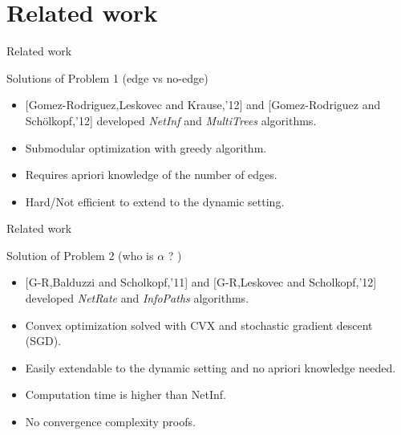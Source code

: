\documentclass{beamer}
\begin{document}
\section{Related work}
\begin{frame}{Related work}
\begin{block}{Solutions of Problem 1 (edge vs no-edge)}
\begin{itemize}
    \item {[Gomez-Rodriguez,Leskovec and Krause,'12]}\nocite{NetInf} and [Gomez-Rodriguez and Schölkopf,'12] \nocite{MultiTrees} developed \textit{NetInf} and \textit{MultiTrees} algorithms.
    \item Submodular optimization with greedy algorithm.
    \item Requires apriori knowledge of the number of edges.
    \item Hard/Not efficient to extend to the dynamic setting.
\end{itemize}
\end{block}
\end{frame}
\begin{frame}{Related work}
\begin{block}{Solution of Problem 2 (who is $\alpha$ ? )}
\begin{itemize}
    \item {[G-R,Balduzzi and Scholkopf,'11]}\nocite{NetRate} and [G-R,Leskovec and Scholkopf,'12]\nocite{InfoPath} developed \textit{NetRate} and \textit{InfoPaths} algorithms.
    \item Convex optimization solved with CVX and stochastic gradient descent (SGD).
    \item Easily extendable to the dynamic setting and no apriori knowledge needed.
    \item Computation time is higher than NetInf.
    \item No convergence complexity proofs.
\end{itemize}
\end{block}
\end{frame}
\end{document}

